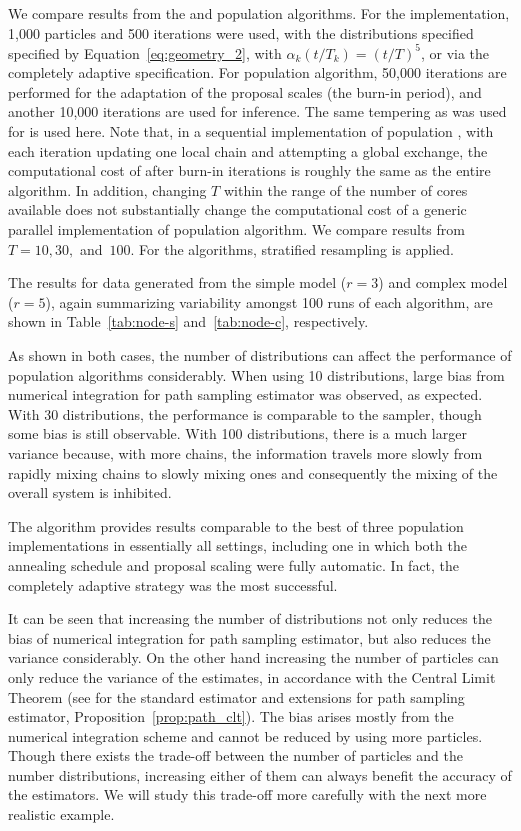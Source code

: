 We compare results from the \smc[2] and population \mcmc algorithms. For the \smc implementation, 1,000 particles and 500 iterations were used, with the distributions specified specified by Equation~\eqref{eq:geometry_2}, with $\alpha_k(t/T_k) = (t/T)^5$, or via the completely adaptive specification. For population \mcmc algorithm, 50,000 iterations are performed for the adaptation of the proposal scales (the burn-in period), and another 10,000 iterations are used for inference. The same tempering as was used for \smc is used here. Note that, in a sequential implementation of population \mcmc, with each iteration updating one local chain and attempting a global exchange, the computational cost of after burn-in iterations is roughly the same as the entire \smc algorithm. In addition, changing $T$ within the range of the number of cores available does not substantially change the computational cost of a generic parallel implementation of population \mcmc algorithm. We compare results from $T = 10,30,$ and~$100$. For the \smc algorithms, stratified resampling is applied.

The results for data generated from the simple model ($r = 3$) and complex model ($r = 5$), again summarizing variability amongst 100 runs of each algorithm, are shown in Table~\ref{tab:node-s} and~\ref{tab:node-c}, respectively.

\begingroup
\afterpage{\clearpage}
\endgroup

As shown in both cases, the number of distributions can affect the performance of population \mcmc algorithms considerably. When using 10 distributions, large bias from numerical integration for path sampling estimator was observed, as expected. With 30 distributions, the performance is comparable to the \smc[2] sampler, though some bias is still observable. With 100 distributions, there is a much larger variance because, with more chains, the information travels more slowly from rapidly mixing chains to slowly mixing ones and consequently the mixing of the overall system is inhibited.

The \smc algorithm provides results comparable to the best of three population \mcmc implementations in essentially all settings, including one in which both the annealing schedule and proposal scaling were fully automatic. In fact, the completely adaptive strategy was the most successful.

It can be seen that increasing the number of distributions not only reduces the bias of numerical integration for path sampling estimator, but also reduces the variance considerably. On the other hand increasing the number of particles can only reduce the variance of the estimates, in accordance with the Central Limit Theorem (see \cite{DelMoral:2006hc} for the standard estimator and extensions for path sampling estimator, Proposition~\ref{prop:path_clt}). The bias arises mostly from the numerical integration scheme and cannot be reduced by using more particles. Though there exists the trade-off between the number of particles and the number distributions, increasing either of them can always benefit the accuracy of the estimators. We will study this trade-off more carefully with the next more realistic example.

